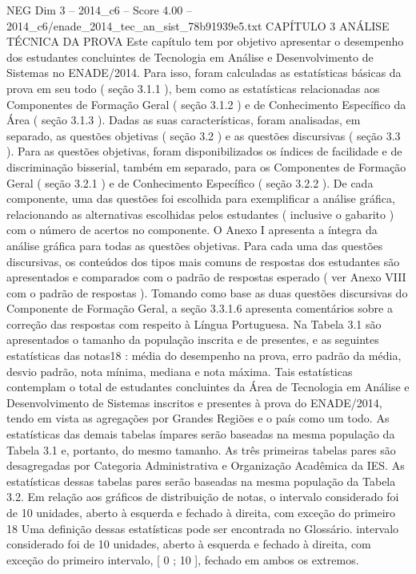 \begin{textsample}{NEG Dim 3 – 2014\_c6 – Score 4.00 – 2014\_c6/enade\_2014\_tec\_an\_sist\_78b91939e5.txt}  \label{ex:f3_neg_253}
CAPÍTULO 3 ANÁLISE TÉCNICA DA PROVA Este capítulo tem por objetivo apresentar o desempenho dos estudantes concluintes de Tecnologia em Análise e Desenvolvimento de Sistemas no ENADE/2014.
Para isso, foram calculadas as estatísticas básicas da prova em seu todo ( seção 3.1.1 ), bem como as estatísticas relacionadas aos Componentes de Formação Geral ( seção 3.1.2 ) e de Conhecimento Específico da Área ( seção 3.1.3 ).
Dadas as suas características, foram analisadas, em separado, as questões objetivas ( seção 3.2 ) e as questões discursivas ( seção 3.3 ).
Para as questões objetivas, foram disponibilizados os índices de facilidade e de discriminação bisserial, também em separado, para os Componentes de Formação Geral ( seção 3.2.1 ) e de Conhecimento Específico ( seção 3.2.2 ).
De cada componente, uma das questões foi escolhida para exemplificar a análise gráfica, relacionando as alternativas escolhidas pelos estudantes ( inclusive o gabarito ) com o número de acertos no componente.
O Anexo I apresenta a íntegra da análise gráfica para todas as questões objetivas.
Para cada uma das questões discursivas, os conteúdos dos tipos mais comuns de respostas dos estudantes são apresentados e comparados com o padrão de respostas esperado ( ver Anexo VIII com o padrão de respostas ).
Tomando como base as duas questões discursivas do Componente de Formação Geral, a seção 3.3.1.6 apresenta comentários sobre a correção das respostas com respeito à Língua Portuguesa.
Na Tabela 3.1 são apresentados o tamanho da população inscrita e de presentes, e as seguintes estatísticas das notas18 : média do desempenho na prova, erro padrão da média, desvio padrão, nota mínima, mediana e nota máxima.
Tais estatísticas contemplam o total de estudantes concluintes da Área de Tecnologia em Análise e Desenvolvimento de Sistemas inscritos e presentes à prova do ENADE/2014, tendo em vista as agregações por Grandes Regiões e o país como um todo.
As estatísticas das demais tabelas ímpares serão baseadas na mesma população da Tabela 3.1 e, portanto, do mesmo tamanho.
As três primeiras tabelas pares são desagregadas por Categoria Administrativa e Organização Acadêmica da IES.
As estatísticas dessas tabelas pares serão baseadas na mesma população da Tabela 3.2.
Em relação aos gráficos de distribuição de notas, o intervalo considerado foi de 10 unidades, aberto à esquerda e fechado à direita, com exceção do primeiro 18 Uma definição dessas estatísticas pode ser encontrada no Glossário. intervalo considerado foi de 10 unidades, aberto à esquerda e fechado à direita, com exceção do primeiro intervalo, [ 0 ; 10 ], fechado em ambos os extremos.

\end{textsample}
